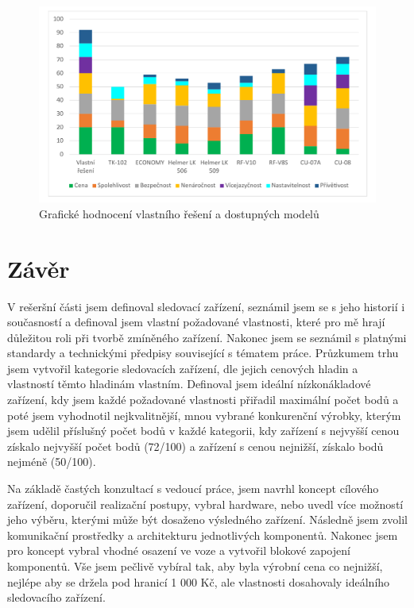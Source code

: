 \documentclass[FM,BP]{tulthesis}  %
\begin{document}
\begin{figure}[H]
\begin{center}
\includegraphics[width=\textwidth]{graphs/graf_bodoveHodnoceni_final.pdf}
\caption{Grafické hodnocení vlastního řešení a dostupných modelů}
\label{image}
\end{center}
\end{figure}


\chapter{Závěr}
V rešeršní části jsem definoval sledovací zařízení, seznámil jsem se s jeho historií i současností a definoval jsem vlastní požadované vlastnosti, které pro mě hrají důležitou roli při tvorbě zmíněného zařízení. Nakonec jsem se seznámil s platnými standardy a technickými předpisy související s tématem práce. Průzkumem trhu jsem vytvořil kategorie sledovacích zařízení, dle jejich cenových hladin a vlastností těmto hladinám vlastním. Definoval jsem ideální nízkonákladové zařízení, kdy jsem každé požadované vlastnosti přiřadil maximální počet bodů a poté jsem vyhodnotil nejkvalitnější, mnou vybrané konkurenční výrobky, kterým jsem udělil příslušný počet bodů v každé kategorii, kdy zařízení s nejvyšší cenou získalo nejvyšší počet bodů (72/100) a zařízení s cenou nejnižší, získalo bodů nejméně (50/100).

Na základě častých konzultací s vedoucí práce, jsem navrhl koncept cílového zařízení, doporučil realizační postupy, vybral hardware, nebo uvedl více možností jeho výběru, kterými může být dosaženo výsledného zařízení. Následně jsem zvolil komunikační prostředky a architekturu jednotlivých komponentů. Nakonec jsem pro koncept vybral vhodné osazení ve voze a vytvořil blokové zapojení komponentů. Vše jsem pečlivě vybíral tak, aby byla výrobní cena co nejnižší, nejlépe aby se držela pod hranicí 1 000 Kč, ale vlastnosti dosahovaly ideálního sledovacího zařízení.
\end{document}

